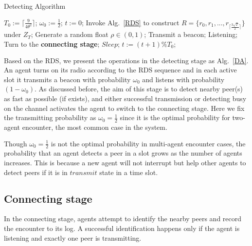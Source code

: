 \begin{algorithm}[!h]
    \caption{Detecting Algorithm}
    \label{DA}
    \begin{algorithmic}[1]
    \STATE $T_0 := \lceil \frac{9}{4\theta^{2}} \rceil$; $\omega_0 :=\frac{1}{2}$; $t := 0$;
    \STATE Invoke Alg.~\ref{RDS} to construct $R = \{r_0, r_1, ...,r_{\lceil 
    \frac{3\sqrt{T}}{2}  \rceil}\}$ under $Z_T$;
              \label{On}
                \STATE Generate a random float $\rho \in (0,1)$;
                    \STATE Transmit a beacon;
                \ELSE
                    \STATE Listening;
                        \STATE Turn to the \textbf{connecting stage};
                    \ENDIF
                \ENDIF
        \ELSE
                \STATE $Sleep$;
        \ENDIF
        \STATE $t := (t + 1) \% T_0$;
    \ENDWHILE
    \end{algorithmic}
\end{algorithm}

Based on the RDS, we present the operations in the detecting stage as Alg.~\ref{DA}.
An agent turns on its radio according to the RDS sequence and in each active slot it
transmits a beacon with probability $\omega_0$ and listens with probability $(1-\omega_0)$.
As discussed before, the aim of this stage is to detect nearby peer(s) as fast as possible 
(if exists), and either successful transmission or detecting busy on the channel activates the agent
to switch to the connecting stage. Here we fix the transmitting probability as $\omega_0 = \frac{1}{2}$ 
since it is the optimal probability for two-agent encounter, the most common case
in the {\sysname} system. 
\begin{remark}
    Though $\omega_0 = \frac{1}{2}$ is not the optimal probability in multi-agent encounter cases, 
    the probability that an agent detects a peer in a slot grows as the number of agents
    increases. This is because a new agent will not interrupt but help other agents to detect peers
    if it is in $transmit$ state in a time slot.
\end{remark}

\subsection{Connecting stage}

In the connecting stage, agents attempt to identify the nearby 
peers and record the encounter to its log.
A successful identification happens only if the agent is listening
and exactly one peer is transmitting. 

